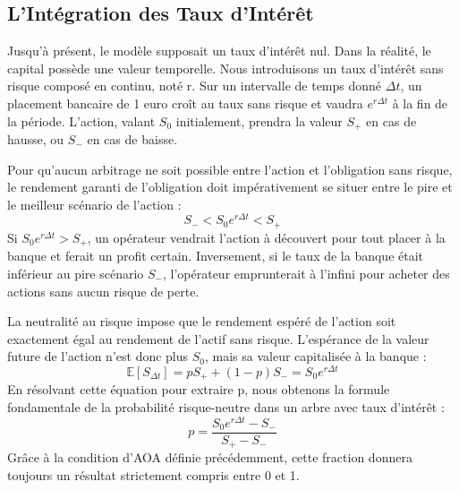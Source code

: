 \newpage

\subsection{L'Intégration des Taux d'Intérêt}

\begin{intuitionbox}
Jusqu'à présent, le modèle supposait un taux d'intérêt nul. Dans la réalité, le capital possède une valeur temporelle. Nous introduisons un taux d'intérêt sans risque composé en continu, noté r. 
Sur un intervalle de temps donné $\Delta t$, un placement bancaire de 1 euro croît au taux sans risque et vaudra $e^{r\Delta t}$ à la fin de la période. 
L'action, valant $S_0$ initialement, prendra la valeur $S_+$ en cas de hausse, ou $S_-$ en cas de baisse.
\end{intuitionbox}

\begin{theorembox}
Pour qu'aucun arbitrage ne soit possible entre l'action et l'obligation sans risque, le rendement garanti de l'obligation doit impérativement se situer entre le pire et le meilleur scénario de l'action :
\begin{equation*}
    S_- < S_0 e^{r\Delta t} < S_+
\end{equation*}
Si $S_0 e^{r\Delta t} > S_+$, un opérateur vendrait l'action à découvert pour tout placer à la banque et ferait un profit certain. Inversement, si le taux de la banque était inférieur au pire scénario $S_-$, l'opérateur emprunterait à l'infini pour acheter des actions sans aucun risque de perte.
\end{theorembox}

\begin{definitionbox}
La neutralité au risque impose que le rendement espéré de l'action soit exactement égal au rendement de l'actif sans risque. L'espérance de la valeur future de l'action n'est donc plus $S_0$, mais sa valeur capitalisée à la banque :
\begin{equation*}
    \mathbb{E}[S_{\Delta t}] = p S_+ + (1-p) S_- = S_0 e^{r\Delta t}
\end{equation*}
En résolvant cette équation pour extraire p, nous obtenons la formule fondamentale de la probabilité risque-neutre dans un arbre avec taux d'intérêt :
\begin{equation*}
    p = \frac{S_0 e^{r\Delta t} - S_-}{S_+ - S_-}
\end{equation*}
Grâce à la condition d'AOA définie précédemment, cette fraction donnera toujours un résultat strictement compris entre 0 et 1.
\end{definitionbox}

